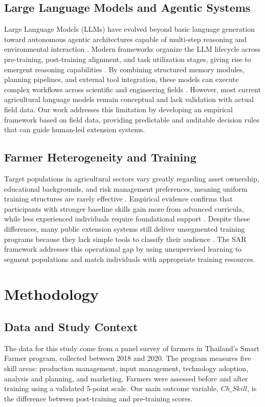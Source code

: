 \documentclass[fleqn,10pt,lineno]{wlpeerj}
\begin{document}
\subsection{Large Language Models and Agentic Systems}
Large Language Models (LLMs) have evolved beyond basic language generation toward autonomous agentic architectures capable of multi-step reasoning and environmental interaction \citep{minaee2025}. Modern frameworks organize the LLM lifecycle across pre-training, post-training alignment, and task utilization stages, giving rise to emergent reasoning capabilities \citep{zhao2026llm}. By combining structured memory modules, planning pipelines, and external tool integration, these models can execute complex workflows across scientific and engineering fields \citep{wang2024, li2025llm}. However, most current agricultural language models remain conceptual and lack validation with actual field data. Our work addresses this limitation by developing an empirical framework based on field data, providing predictable and auditable decision rules that can guide human-led extension systems.

\subsection{Farmer Heterogeneity and Training}
Target populations in agricultural sectors vary greatly regarding asset ownership, educational backgrounds, and risk management preferences, meaning uniform training structures are rarely effective \citep{feder1985, anderson2004}. Empirical evidence confirms that participants with stronger baseline skills gain more from advanced curricula, while less experienced individuals require foundational support \citep{davis2012}. Despite these differences, many public extension systems still deliver unsegmented training programs because they lack simple tools to classify their audience \citep{anderson2004}. The SAR framework addresses this operational gap by using unsupervised learning to segment populations and match individuals with appropriate training resources.

\section{Methodology}

\subsection{Data and Study Context}
The data for this study come from a panel survey of farmers in Thailand's Smart Farmer program, collected between 2018 and 2020. The program measures five skill areas: production management, input management, technology adoption, analysis and planning, and marketing. Farmers were assessed before and after training using a validated 5-point scale. Our main outcome variable, $Ch\_Skill$, is the difference between post-training and pre-training scores.
\end{document}
